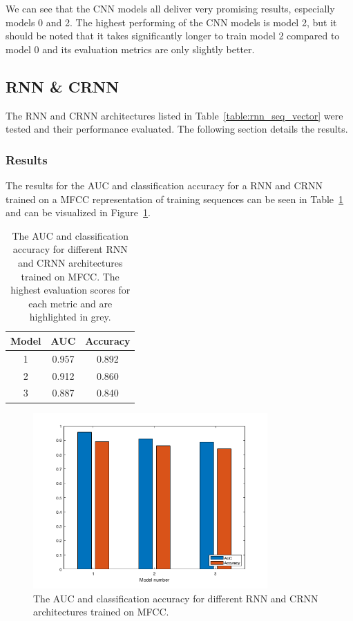 We can see that the CNN models all deliver very promising results, especially
models 0 and 2. The highest performing of the CNN models is model 2, but it
should be noted that it takes significantly longer to train model 2 compared to
model 0 and its evaluation metrics are only slightly better.

\subsection{RNN \& CRNN}

The RNN and CRNN architectures listed in Table~\ref{table:rnn_seq_vector} were
tested and their performance evaluated. The following section details the
results.

\subsubsection{Results}

The results for the AUC and classification accuracy for a RNN and CRNN trained
on a MFCC representation of training sequences can be seen in
Table~\ref{table:rnn_mfcc_results} and can be visualized in
Figure~\ref{fig:rnn_mfcc_results}.

\begin{table}[h!t]
\begin{center}
\begin{tabular}{c c c}
\toprule
Model & AUC & Accuracy \\ [0.5ex]
\midrule
1 & \cellcolor{lightgray} 0.957 & \cellcolor{lightgray} 0.892 \\
2 & 0.912 & 0.860 \\
3 & 0.887 & 0.840 \\
\bottomrule
\end{tabular}
\caption{The AUC and classification accuracy for different RNN and CRNN
architectures trained on MFCC\@. The highest evaluation scores for each metric
and are highlighted in grey.}\label{table:rnn_mfcc_results}
\end{center}
\end{table}

\begin{figure}[ht]
  \centering
  \includegraphics[width=0.8\textwidth]{figures/hyp2_rnn_mfcc_results.png}
  \caption{The AUC and classification accuracy for different RNN and CRNN architectures
  trained on MFCC.}\label{fig:rnn_mfcc_results}
\end{figure}

